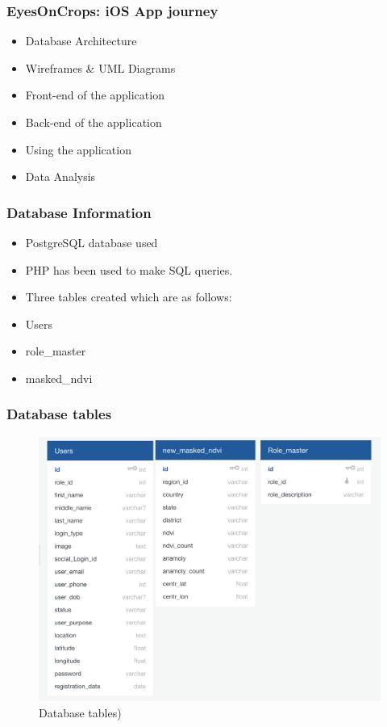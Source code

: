 \begin{frame}
\frametitle{EyesOnCrops: iOS App journey}
\begin{itemize}
    \item Database Architecture 
    \item Wireframes \& UML Diagrams
    \item Front-end of the application
    \item Back-end of the application
    \item Using the application
    \item Data Analysis
\end{itemize}
\end{frame}

\begin{frame}
\frametitle{Database Information}
\begin{itemize}
    \item PostgreSQL database used
    \item PHP has been used to make SQL queries.
    \item Three tables created which are as follows:
\end{itemize}
 \begin{itemize}
        \item Users
        \item role\_master
        \item masked\_ndvi
    \end{itemize}
\end{frame}

\begin{frame}
\frametitle{Database tables}
\begin{figure}
    \centering
    \begin{minipage}{0.75\columnwidth}
    \includegraphics[width=\linewidth]{final/figures/database_structure.png}
    \caption{\tiny{Database tables)}}
    \end{minipage}
\end{figure}
\end{frame}



